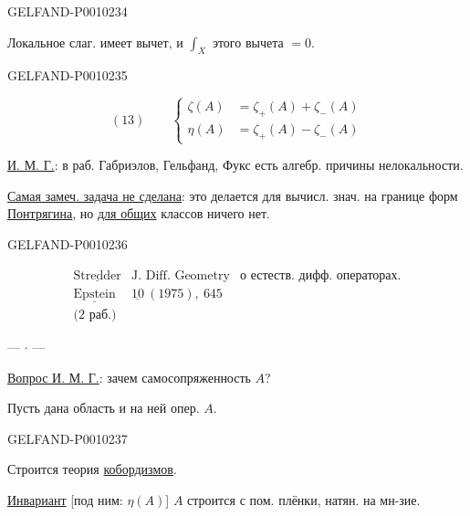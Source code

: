 \begin{GelfandAdjacentEvidence}{GELFAND-P001023}{4}


Локальное слаг. имеет вычет, и $\displaystyle\int_X$ этого вычета $=0$.
\end{GelfandAdjacentEvidence}
\begin{GelfandAdjacentEvidence}{GELFAND-P001023}{5}


\[
(13)\qquad
\left\{
\begin{aligned}
\zeta(A)&=\zeta_+(A)+\zeta_-(A)\\
\eta(A)&=\zeta_+(A)-\zeta_-(A)
\end{aligned}
\right.
\]

\underline{И. М. Г.}: в раб. Габриэлов, Гельфанд, Фукс есть алгебр. причины нелокальности.

\underline{Самая замеч. задача не сделана}: это делается для вычисл. знач. на границе форм
\underline{Понтрягина}, но \underline{для общих} классов ничего нет.
\end{GelfandAdjacentEvidence}
\begin{GelfandAdjacentEvidence}{GELFAND-P001023}{6}


\[
\begin{array}{l|l|l}
\underline{\text{Stredder}}&\text{J. Diff. Geometry}&\text{о естеств. дифф. операторах.}\\
\underline{\text{Epstein}}&\underline{10}\ (1975),\ 645&\\
\text{(2 раб.)}&&
\end{array}
\]

\begin{center}--- $\cdot$ ---\end{center}

\underline{Вопрос И. М. Г.}: зачем самосопряженность $A$?

Пусть дана область и на ней опер. $A$.

\end{GelfandAdjacentEvidence}
\begin{GelfandAdjacentEvidence}{GELFAND-P001023}{7}


Строится теория \underline{кобордизмов}.

\underline{Инвариант} [под ним: $\eta(A)$] $A$ строится с пом. плёнки, натян. на мн-зие.
\end{GelfandAdjacentEvidence}



